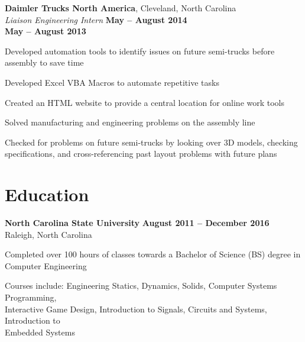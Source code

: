 \documentclass[margin,line]{resume}
\begin{document}
\begin{resume}
    \textbf{Daimler Trucks North America}, Cleveland, North Carolina \\
    \textsl{Liaison Engineering Intern} \hfill \textbf{May -- August 2014}\\
    \vspace{1mm}
    \hfill \textbf{May -- August 2013}\\
    \vspace{-4mm}
    \begin{list2}
    \item Developed automation tools to identify issues on future semi-trucks before assembly to save time
    \item Developed Excel VBA Macros to automate repetitive tasks
    \item Created an HTML website to provide a central location for online work tools
    \item Solved manufacturing and engineering problems on the assembly line
    \item Checked for problems on future semi-trucks by looking over 3D models, checking specifications, and cross-referencing past layout problems with future plans
    \end{list2}
    \vspace{2mm}

    \section{\mysidestyle Education}

    \textbf{North Carolina State University} \hfill \textbf{August 2011 -- December 2016}\\
    Raleigh, North Carolina\\
    \vspace{-4mm}
    \begin{list2}
    	\item Completed over 100 hours of classes towards a Bachelor of Science (BS) degree in Computer Engineering
        \item Courses include: Engineering Statics, Dynamics, Solids, Computer Systems Programming,\\
        Interactive Game Design, Introduction to Signals, Circuits and Systems, Introduction to\\
        Embedded Systems
    \end{list2}



\end{resume}
\end{document}

